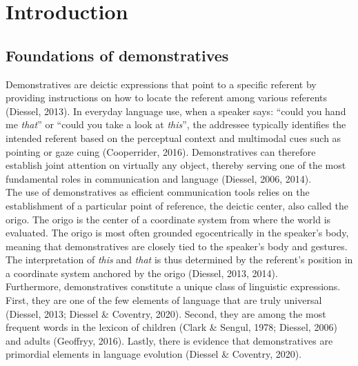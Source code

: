 \documentclass[11pt, a4paper]{article}
\begin{document}
\newpage

\section{Introduction}

\subsection{Foundations of demonstratives}
Demonstratives are deictic expressions that point to a specific referent by providing instructions on how to locate the referent among various referents (Diessel, 2013). In everyday language use, when a speaker says: “could you hand me \textit{that}” or “could you take a look at \textit{this}”, the addressee typically  identifies the intended referent based on the perceptual context and multimodal cues such as pointing or gaze cuing (Cooperrider, 2016). Demonstratives can therefore establish joint attention on virtually any object, thereby serving one of the most fundamental roles in communication and language (Diessel, 2006, 2014).\\

The use of demonstratives as efficient communication tools relies on the establishment of a particular point of reference, the deictic center, also called the origo. The origo is the center of a coordinate system from where the world is evaluated. The origo is most often grounded egocentrically in the speaker’s body, meaning that demonstratives are closely tied to the speaker’s body and gestures. The interpretation of \textit{this} and \textit{that} is thus determined by the referent’s position in a coordinate system anchored by the origo (Diessel, 2013, 2014). \\

Furthermore, demonstratives constitute a unique class of linguistic expressions. First, they are one of the few elements of language that are truly universal (Diessel, 2013; Diessel \& Coventry, 2020). Second, they are among the most frequent words in the lexicon of children (Clark \& Sengul, 1978; Diessel, 2006) and adults (Geoffryy, 2016). Lastly, there is evidence that demonstratives are primordial elements in language evolution (Diessel \& Coventry, 2020).
\end{document}

